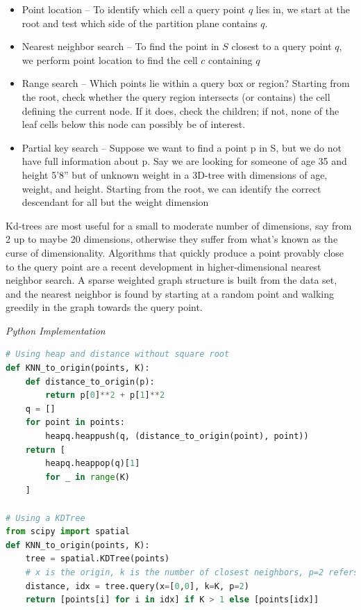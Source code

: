 \documentclass{article}
\begin{document}
    \begin{itemize}
        \item Point location – To identify which cell a query point $q$ lies in, we start at the root and test which side of the partition plane contains $q$.
        
        \item Nearest neighbor search – To find the point in $S$ closest to a query point $q$, we perform point location to find the cell $c$ containing $q$
        
        \item Range search – Which points lie within a query box or region? Starting from the root, check whether the query region intersects (or contains) the cell defining the current node. If it does, check the children; if not, none of the leaf cells below this node can possibly be of interest.
        
        \item Partial key search – Suppose we want to find a point p in S, but we do not have full information about p. Say we are looking for someone of age 35 and height 5’8” but of unknown weight in a 3D-tree with dimensions of age, weight, and height. Starting from the root, we can identify the correct descendant for all but the weight dimension
    \end{itemize}
    
    Kd-trees are most useful for a small to moderate number of dimensions, say from 2 up to maybe 20 dimensions, otherwise they suffer from what's known as the curse of dimensionality. Algorithms that quickly produce a point provably close to the query point are a recent development in higher-dimensional nearest neighbor search. A sparse weighted graph structure is built from the data set, and the nearest neighbor is found by starting at a random point and walking greedily in the graph towards the query point.
    
\vspace{8pt} \emph{Python Implementation}
\begin{lstlisting}[language=Python]
# Using heap and distance without square root
def KNN_to_origin(points, K):
    def distance_to_origin(p):
        return p[0]**2 + p[1]**2
    q = []
    for point in points:
        heapq.heappush(q, (distance_to_origin(point), point))
    return [
        heapq.heappop(q)[1]
        for _ in range(K)
    ]

# Using a KDTree
from scipy import spatial
def KNN_to_origin(points, K):
    tree = spatial.KDTree(points)
	# x is the origin, k is the number of closest neighbors, p=2 refers to choosing L2 norm (euclidean distance)
    distance, idx = tree.query(x=[0,0], k=K, p=2) 
    return [points[i] for i in idx] if K > 1 else [points[idx]]
\end{lstlisting}
\end{document}
